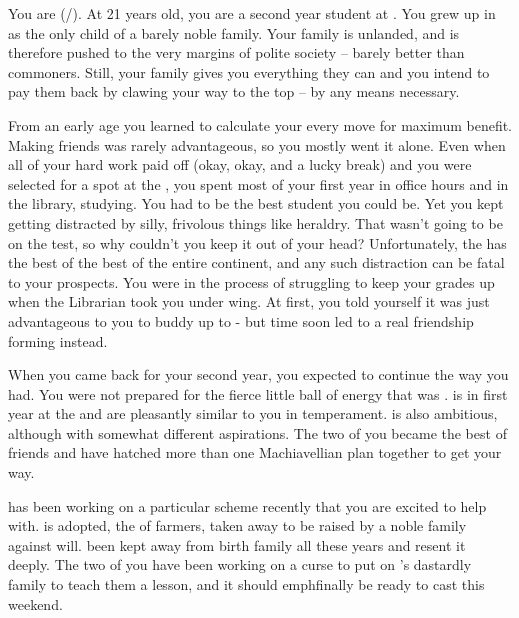 \documentclass[char]{GL2020}
\begin{document}
\name{\cLibAssist{}}

You are \cLibAssist{} (\cLibAssist{\they}/\cLibAssist{\them}). At 21 years old, you are a second year student at \pSchool{}. You grew up in \pFarm{} as the only child of a barely noble family. Your family is unlanded, and is therefore pushed to the very margins of polite society -- barely better than commoners. Still, your family gives you everything they can and you intend to pay them back by clawing your way to the top -- by any means necessary.

From an early age you learned to calculate your every move for maximum benefit. Making friends was rarely advantageous, so you mostly went it alone. Even when all of your hard work paid off (okay, okay, and a lucky break) and you were selected for a spot at the \pSchool{}, you spent most of your first year in office hours and in the library, studying. You had to be the best student you could be. Yet you kept getting distracted by silly, frivolous things like heraldry. That wasn’t going to be on the test, so why couldn’t you keep it out of your head? Unfortunately, the \pSc{} has the best of the best of the entire continent, and any such distraction can be fatal to your prospects. You were in the process of struggling to keep your grades up when the Librarian took you under \cLibrarian{\their} wing. At first, you told yourself it was just advantageous to you to buddy up to \cLibrarian{\them} - but time soon led to a real friendship forming instead.

When you came back for your second year, you expected to continue the way you had. You were not prepared for the fierce little ball of energy that was \cAdopted{}. \cAdopted{} is in \cAdopted{\their} first year at the \pSc{} and \cAdopted{\they} are pleasantly similar to you in temperament. \cAdopted{} is also ambitious, although with somewhat different aspirations. The two of you became the best of friends and have hatched more than one Machiavellian plan together to get your way.

\cAdopted{} has been working on a particular scheme recently that you are excited to help with. \cAdopted{} is adopted, the \cAdopted{\child} of farmers, taken away to be raised by a noble family against \cAdopted{\their} will. \cAdopted{\They} \cAdopted{\have} been kept away from \cAdopted{\their} birth family all these years and \cAdopted{\they} resent\cAdopted{\plural} it deeply. The two of you have been working on a curse to put on \cAdopted{}’s dastardly family to teach them a lesson, and it should emph{finally} be ready to cast this weekend.
\end{document}
